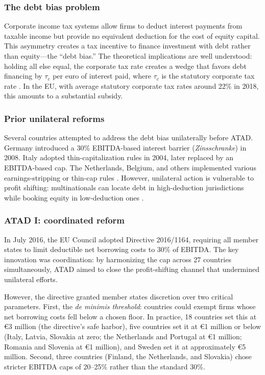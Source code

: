 \documentclass[12pt]{article}
\begin{document}
\subsubsection*{The debt bias problem} Corporate income tax systems allow firms to deduct interest payments from taxable income but provide no equivalent deduction for the cost of equity capital. This asymmetry creates a tax incentive to finance investment with debt rather than equity---the ``debt bias.'' The theoretical implications are well understood: holding all else equal, the corporate tax rate creates a wedge that favors debt financing by $\tau_c$ per euro of interest paid, where $\tau_c$ is the statutory corporate tax rate \citep{modigliani1963corporate, myers1977determinants}. In the EU, with average statutory corporate tax rates around 22\% in 2018, this amounts to a substantial subsidy.

\subsubsection*{Prior unilateral reforms} Several countries attempted to address the debt bias unilaterally before ATAD. Germany introduced a 30\% EBITDA-based interest barrier (\textit{Zinsschranke}) in 2008. Italy adopted thin-capitalization rules in 2004, later replaced by an EBITDA-based cap. The Netherlands, Belgium, and others implemented various earnings-stripping or thin-cap rules \citep{buettner2012impact, de2012tax}. However, unilateral action is vulnerable to profit shifting: multinationals can locate debt in high-deduction jurisdictions while booking equity in low-deduction ones \citep{desai2004taxonomy, huizinga2008capital}.

\subsubsection*{ATAD I: coordinated reform} In July 2016, the EU Council adopted Directive 2016/1164, requiring all member states to limit deductible net borrowing costs to 30\% of EBITDA. The key innovation was coordination: by harmonizing the cap across 27 countries simultaneously, ATAD aimed to close the profit-shifting channel that undermined unilateral efforts.

However, the directive granted member states discretion over two critical parameters. First, the \textit{de minimis threshold}: countries could exempt firms whose net borrowing costs fell below a chosen floor. In practice, 18 countries set this at \euro{}3 million (the directive's safe harbor), five countries set it at \euro{}1 million or below (Italy, Latvia, Slovakia at zero; the Netherlands and Portugal at \euro{}1 million; Romania and Slovenia at \euro{}1 million), and Sweden set it at approximately \euro{}5 million. Second, three countries (Finland, the Netherlands, and Slovakia) chose stricter EBITDA caps of 20--25\% rather than the standard 30\%.
\end{document}
